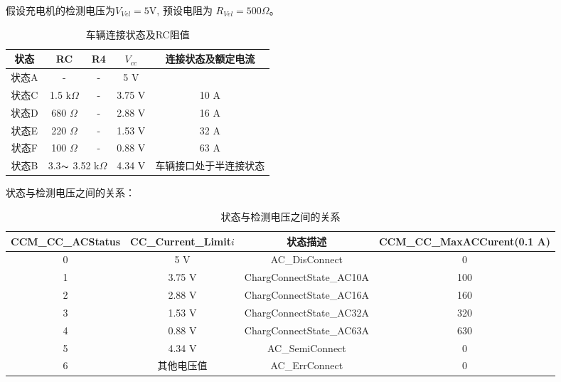        \begin{example}
         假设充电机的检测电压为$V_{Vel} = 5 \mathrm{V}$, 预设电阻为 $R_{Vel} = 500 \Omega$。
            \begin{table}[H]
                \renewcommand{\arraystretch}{1.3}
                \centering
                \caption{车辆连接状态及RC阻值}
                \begin{tabular}{ccccc}   
                    \toprule
                    状态  & RC  & R4 & $V_{cc}$ & 连接状态及额定电流\\    
                    \midrule
                    状态A  & -  & - & 5 V &   \\
                    状态C  & 1.5 k$\Omega$  & - & 3.75 V &  10 A \\
                    状态D  & 680 $\Omega$  & - &  2.88 V &  16 A  \\
                    状态E  & 220 $\Omega$ & - &   1.53 V &  32 A  \\
                    状态F  & 100 $\Omega$ & - &   0.88 V &  63 A  \\
                    状态B  & \multicolumn{2}{c}{3.3$\thicksim$ 3.52 k$\Omega$} & 4.34 V &车辆接口处于半连接状态\\
                    \bottomrule
                \end{tabular}
                \label{tab:RC1}
            \end{table}

            状态与检测电压之间的关系：
            \begin{table}[H]
                \renewcommand{\arraystretch}{1.3}
                \centering
                \caption{ 状态与检测电压之间的关系}
                \begin{tabular}{cccc}   
                    \toprule
                    CCM\_CC\_ACStatus  &  CC\_Current\_Limit$i$  & 状态描述 & CCM\_CC\_MaxACCurent(0.1 A)\\    
                    \midrule
                    0  &  5 V    &  AC\_DisConnect  & 0 \\
                    1  &  3.75 V &   ChargConnectState\_AC10A & 100\\
                    2  &  2.88 V &   ChargConnectState\_AC16A & 160  \\
                    3  &  1.53 V &   ChargConnectState\_AC32A & 320 \\
                    4  &  0.88 V &   ChargConnectState\_AC63A & 630 \\
                    5  &  4.34 V &   AC\_SemiConnect          &    0\\
                    6  &  其他电压值 & AC\_ErrConnect          & 0\\
                    \bottomrule
                \end{tabular}
                \label{tab:RC2}
            \end{table}
       \end{example}

